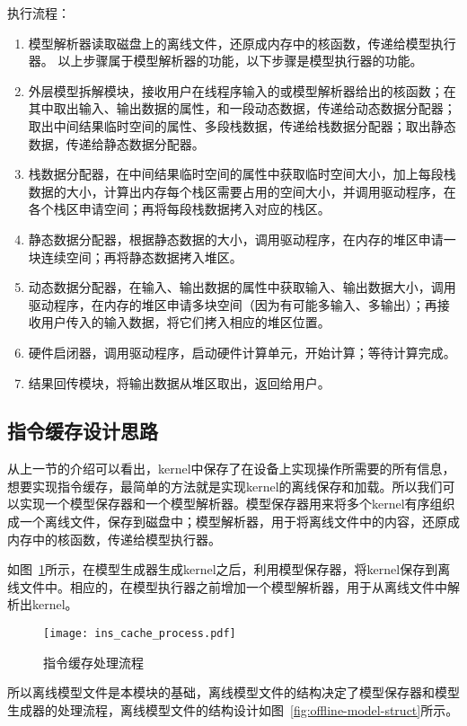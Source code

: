 执行流程：
\begin{enumerate}
\item 模型解析器读取磁盘上的离线文件，还原成内存中的核函数，传递给模型执行器。
以上步骤属于模型解析器的功能，以下步骤是模型执行器的功能。
\item 外层模型拆解模块，接收用户在线程序输入的或模型解析器给出的核函数；在其中取出输入、输出数据的属性，和一段动态数据，传递给动态数据分配器；取出中间结果临时空间的属性、多段栈数据，传递给栈数据分配器；取出静态数据，传递给静态数据分配器。
\item 栈数据分配器，在中间结果临时空间的属性中获取临时空间大小，加上每段栈数据的大小，计算出内存每个栈区需要占用的空间大小，并调用驱动程序，在各个栈区申请空间；再将每段栈数据拷入对应的栈区。
\item 静态数据分配器，根据静态数据的大小，调用驱动程序，在内存的堆区申请一块连续空间；再将静态数据拷入堆区。
\item 动态数据分配器，在输入、输出数据的属性中获取输入、输出数据大小，调用驱动程序，在内存的堆区申请多块空间（因为有可能多输入、多输出）；再接收用户传入的输入数据，将它们拷入相应的堆区位置。
\item 硬件启闭器，调用驱动程序，启动硬件计算单元，开始计算；等待计算完成。
\item 结果回传模块，将输出数据从堆区取出，返回给用户。
\end{enumerate}

\subsection {指令缓存设计思路}
从上一节的介绍可以看出，kernel中保存了在设备上实现操作所需要的所有信息，想要实现指令缓存，最简单的方法就是实现kernel的离线保存和加载。所以我们可以实现一个模型保存器和一个模型解析器。模型保存器用来将多个kernel有序组织成一个离线文件，保存到磁盘中；模型解析器，用于将离线文件中的内容，还原成内存中的核函数，传递给模型执行器。

如图~\ref{fig:ins-cache-process}所示，在模型生成器生成kernel之后，利用模型保存器，将kernel保存到离线文件中。相应的，在模型执行器之前增加一个模型解析器，用于从离线文件中解析出kernel。

\begin{figure}[htb]
  \centering
  \texttt{[image: ins\_cache\_process.pdf]}
  \caption{指令缓存处理流程}
  \label{fig:ins-cache-process}
\end{figure}

所以离线模型文件是本模块的基础，离线模型文件的结构决定了模型保存器和模型生成器的处理流程，离线模型文件的结构设计如图~\ref{fig:offline-model-struct}所示。


